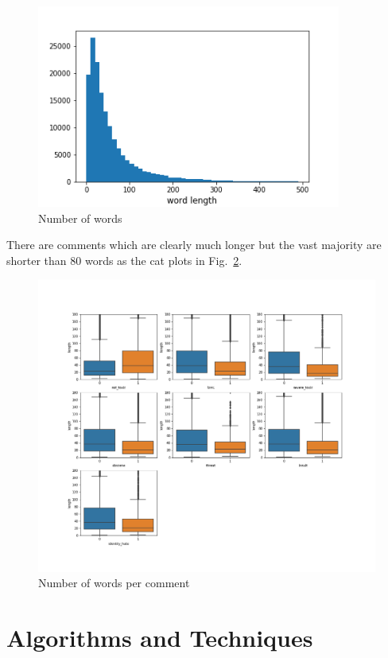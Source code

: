 \documentclass{report}
\begin{document}
\begin{figure}[!h]
\centering
  \includegraphics[width=100mm]{../local/plots_tables/word_length_hist.png}
  \caption{Number of words}
  \label{fig:hist}
\end{figure}
There are comments  which are clearly much longer but the vast majority are shorter than 80 words as the cat plots in Fig.~\ref{fig:catplots}.
\begin{figure}[!h]
\centering
  \includegraphics[width=170mm]{../local/plots_tables/catplots.png}
  \caption{Number of words per comment}
  \label{fig:catplots}
\end{figure}

\section{Algorithms and Techniques}
\end{document}
